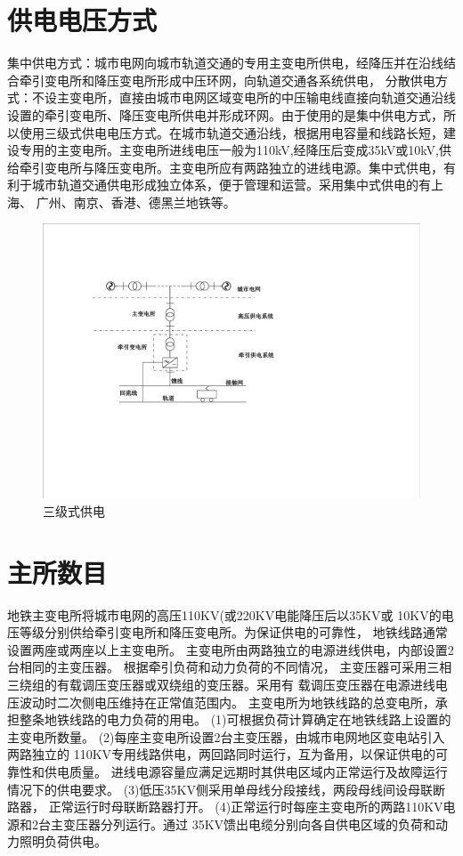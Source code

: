 \section{供电电压方式}
集中供电方式：城市电网向城市轨道交通的专用主变电所供电，经降压并在沿线结合牵引变电所和降压变电所形成中压环网，向轨道交通各系统供电， 分散供电方式：不设主变电所，直接由城市电网区域变电所的中压输电线直接向轨道交通沿线设置的牵引变电所、降压变电所供电并形成环网。由于使用的是集中供电方式，所以使用三级式供电电压方式。在城市轨道交通沿线，根据用电容量和线路长短，建设专用的主变电所。主变电所进线电压一般为110kV,经降压后变成35kV或10kV,供给牵引变电所与降压变电所。主变电所应有两路独立的进线电源。集中式供电，有利于城市轨道交通供电形成独立体系，便于管理和运营。采用集中式供电的有上海、 广州、南京、香港、德黑兰地铁等。\par
\begin{figure}[h]
	\centering
	\includegraphics[width=0.7\linewidth]{figures/三级式供电}
	\caption{三级式供电}
	\label{fig:三级式供电}
\end{figure}

\section{主所数目}
地铁主变电所将城市电网的高压110KV(或220KV电能降压后以35KV或
10KV的电压等级分别供给牵引变电所和降压变电所。为保证供电的可靠性，
地铁线路通常设置两座或两座以上主变电所。
主变电所由两路独立的电源进线供电，内部设置2台相同的主变压器。
根据牵引负荷和动力负荷的不同情况，
主变压器可采用三相三绕组的有载调压变压器或双绕组的变压器。采用有
载调压变压器在电源进线电压波动时二次侧电压维持在正常值范围内。
主变电所为地铁线路的总变电所，承担整条地铁线路的电力负荷的用电。\newline
(1)可根据负荷计算确定在地铁线路上设置的主变电所数量。\newline
(2)每座主变电所设置2台主变压器，由城市电网地区变电站引入两路独立的
110KV专用线路供电，两回路同时运行，互为备用，以保证供电的可靠性和供电质量。
进线电源容量应满足远期时其供电区域内正常运行及故障运行情况下的供电要求。\newline
(3)低压35KV侧采用单母线分段接线，两段母线间设母联断路器，
正常运行时母联断路器打开。\newline
(4)正常运行时每座主变电所的两路110KV电源和2台主变压器分列运行。通过
35KV馈出电缆分别向各自供电区域的负荷和动力照明负荷供电。\newline
